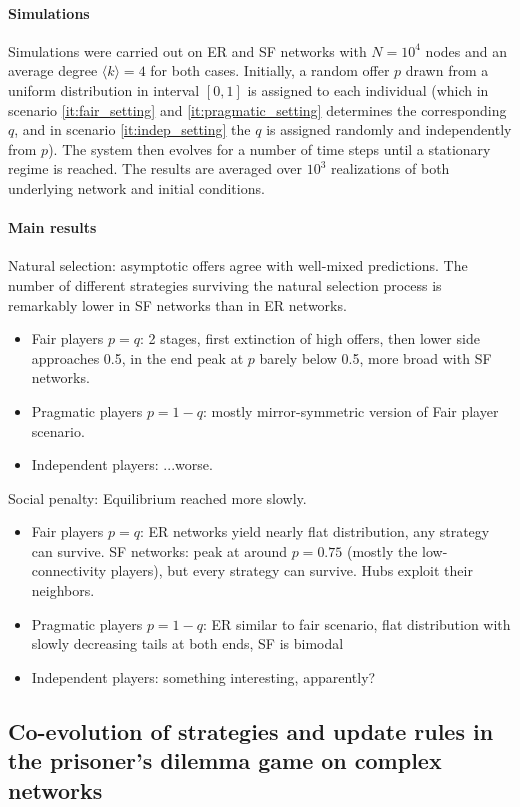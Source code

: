 \paragraph{Simulations}
Simulations were carried out on ER and SF networks with $N= 10^4$ nodes and an average degree $\langle k\rangle = 4$ for both cases. Initially, a random offer $p$ drawn from a uniform distribution in interval $[0, 1]$ is assigned to each individual (which in scenario \ref{it:fair_setting} and \ref{it:pragmatic_setting} determines the corresponding $q$, and in scenario \ref{it:indep_setting} the $q$ is assigned randomly and independently from $p$). The system then evolves for a number of time steps until a stationary regime is reached. The results are averaged over $10^3$ realizations of both underlying network and initial conditions.
%
\paragraph{Main results}
Natural selection: asymptotic offers agree with well-mixed predictions. The number of different strategies surviving the natural selection process is remarkably lower in SF networks than in ER networks.
\begin{itemize}
	\item Fair players $p=q$: 2 stages, first extinction of high offers, then lower side approaches 0.5, in the end peak at $p$ barely below 0.5, more broad with SF networks.
	\item Pragmatic players $p = 1-q$: mostly mirror-symmetric version of Fair player scenario.
	\item Independent players: ...worse. 
\end{itemize}
Social penalty: Equilibrium reached more slowly.
\begin{itemize}
	\item Fair players $p=q$: ER networks yield nearly flat distribution, any strategy can survive. SF networks: peak at around $p=0.75$ (mostly the low-connectivity players), but every strategy can survive. Hubs exploit their neighbors.
	\item Pragmatic players $p = 1-q$: ER similar to fair scenario, flat distribution with slowly decreasing tails at both ends, SF is bimodal
	\item Independent players: something interesting, apparently?
\end{itemize}
%
\subsection{Co-evolution of strategies and update rules in the prisoner's dilemma game on complex networks~\cite{Cardillo_2010}}

